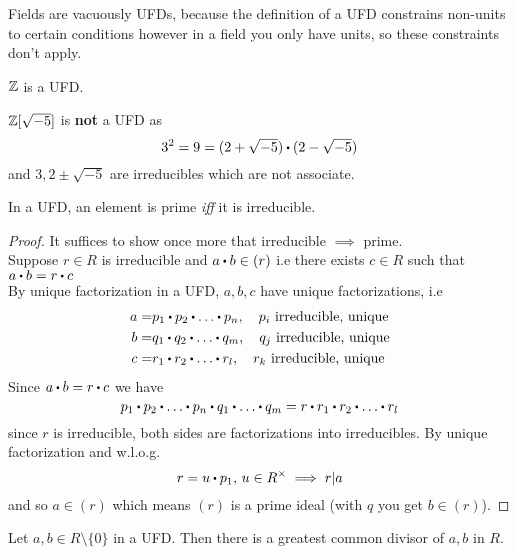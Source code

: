 \documentclass[../Main.tex]{subfiles}
\begin{document}
\begin{example}
	Fields are vacuously UFDs, because the definition of a UFD constrains non-units to certain conditions however in a field you only have units, so these constraints don't apply.
\end{example}
\begin{example}
	$\mathbb{Z}$ is a UFD.
\end{example}
\begin{example}
	$\mathbb{Z}[\sqrt{-5}]$ is \textbf{not} a UFD as
	\[3^2=9=(2+\sqrt{-5})\rdot (2-\sqrt{-5})\]
	and $3,2\pm \sqrt{-5}$ are irreducibles which are not associate.
\end{example}
\begin{prop}[title = Element in UFD is prime iff it is irreducible]
	In a UFD, an element is prime \textit{iff} it is irreducible.
\end{prop}
\begin{proof}
	It suffices to show once more that irreducible $\implies$ prime.\\
	Suppose $r\in R$ is irreducible and $a\rdot b\in (r)$ i.e there exists $c\in R$ such that $a\rdot b=r\rdot c$\\
	By unique factorization in a UFD, $a,b,c$ have unique factorizations, i.e
	\begin{align*}
	a=&p_1\rdot p_2\rdot \dots \rdot p_n,\quad p_i \text{ irreducible, unique}\\
	b=&q_1\rdot q_2\rdot \dots \rdot q_m,\quad q_j \text{ irreducible, unique}\\
	c=&r_1\rdot r_2\rdot \dots \rdot r_l,\quad r_k \text{ irreducible, unique}
	\end{align*}
	Since $a\rdot b=r\rdot c$ we have
	\[p_1\rdot p_2\rdot \dots \rdot p_n \rdot q_1 \rdot \dots \rdot q_m = r \rdot r_1 \rdot r_2\rdot  \dots \rdot r_l\]
	since $r$ is irreducible, both sides are factorizations into irreducibles. By unique factorization and w.l.o.g. 
	\[r=u\rdot p_1,\, u\in R^\times \implies r|a\qedhere\]
	and so $a\in (r)$ which means $(r)$ is a prime ideal (with $q$ you get $b\in (r)$).
\end{proof}
\newpage
\begin{prop}[title=Nonzero elements in UFD have GCD]
	Let $a,b\in R\setminus \{0\}$ in a UFD. Then there is a greatest common divisor of $a,b$ in $R$.
\end{prop}
\end{document}

